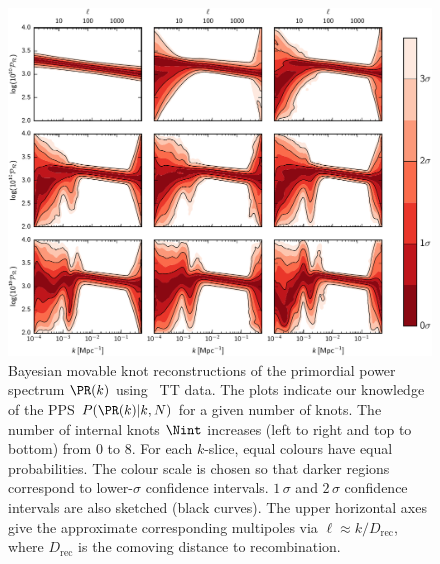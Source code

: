 \begin{figure}[tp]
  \includegraphics[width=\textwidth]{chapters/pps_reconstruction/figures/array}
  \caption{Bayesian movable knot reconstructions of the primordial power spectrum \(\PR(k)\) using \Planck\ TT data.  The plots indicate our knowledge of the PPS \(P(\PR(k)|k,N)\) for a given number of knots.  The number of internal knots \(\Nint\) increases (left to right and top to bottom) from \(0\) to \(8\).  For each \(k\)-slice, equal colours have equal probabilities. The colour scale is chosen so that darker regions correspond to lower-\(\sigma\) confidence intervals.  \(1\,\sigma \) and \(2\,\sigma \) confidence intervals are also sketched (black curves).  The upper horizontal axes give the approximate corresponding multipoles via \(\ell \approx k/D_\mathrm{rec}\), where \(D_\mathrm{rec}\) is the comoving distance to recombination.}\label{fig:Pkr0}
\end{figure}


